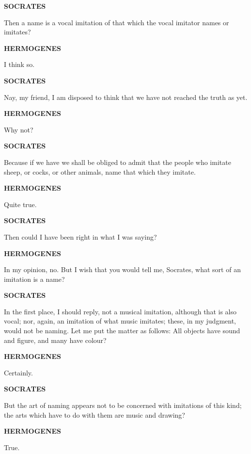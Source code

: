 \documentclass[11pt,letter]{article}
\begin{document}
\par \textbf{SOCRATES}
\par   Then a name is a vocal imitation of that which the vocal imitator names or imitates?

\par \textbf{HERMOGENES}
\par   I think so.

\par \textbf{SOCRATES}
\par   Nay, my friend, I am disposed to think that we have not reached the truth as yet.

\par \textbf{HERMOGENES}
\par   Why not?

\par \textbf{SOCRATES}
\par   Because if we have we shall be obliged to admit that the people who imitate sheep, or cocks, or other animals, name that which they imitate.

\par \textbf{HERMOGENES}
\par   Quite true.

\par \textbf{SOCRATES}
\par   Then could I have been right in what I was saying?

\par \textbf{HERMOGENES}
\par   In my opinion, no. But I wish that you would tell me, Socrates, what sort of an imitation is a name?

\par \textbf{SOCRATES}
\par   In the first place, I should reply, not a musical imitation, although that is also vocal; nor, again, an imitation of what music imitates; these, in my judgment, would not be naming. Let me put the matter as follows:  All objects have sound and figure, and many have colour?

\par \textbf{HERMOGENES}
\par   Certainly.

\par \textbf{SOCRATES}
\par   But the art of naming appears not to be concerned with imitations of this kind; the arts which have to do with them are music and drawing?

\par \textbf{HERMOGENES}
\par   True.
\end{document}
